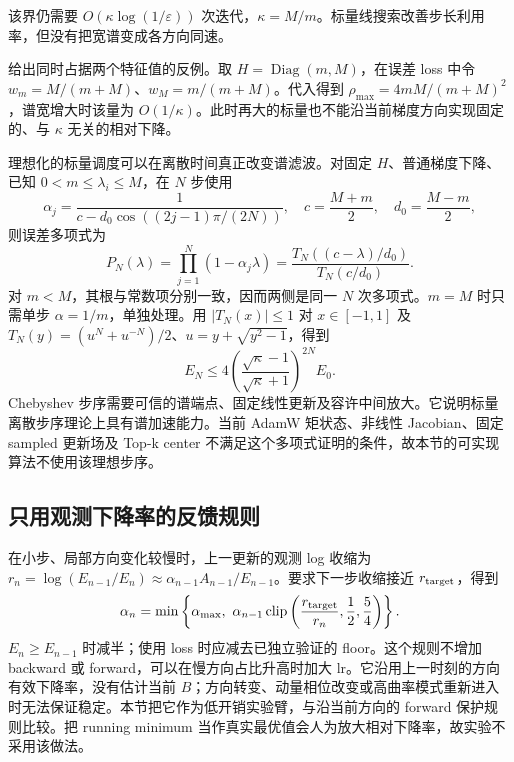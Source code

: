 \documentclass[lang=cn,scheme=chinese,openany]{../book/elegantbook}
\begin{document}
该界仍需要 $O(\kappa\log(1/\varepsilon))$ 次迭代，$\kappa=M/m$。标量线搜索改善步长利用率，但没有把宽谱变成各方向同速。

给出同时占据两个特征值的反例。取 $H=\operatorname{Diag}(m,M)$，在误差 loss 中令 $w_m=M/(m+M)$、$w_M=m/(m+M)$。代入得到 $\rho_{\max}=4mM/(m+M)^2$，谱宽增大时该量为 $O(1/\kappa)$。此时再大的标量也不能沿当前梯度方向实现固定的、与 $\kappa$ 无关的相对下降。

理想化的标量调度可以在离散时间真正改变谱滤波。对固定 $H$、普通梯度下降、已知 $0<m\le\lambda_i\le M$，在 $N$ 步使用
\begin{equation}
\alpha_j=\frac{1}{c-d_0\cos((2j-1)\pi/(2N))},\quad
c=\frac{M+m}{2},\quad d_0=\frac{M-m}{2},
\end{equation}
则误差多项式为
\begin{equation}
P_N(\lambda)=\prod_{j=1}^N(1-\alpha_j\lambda)
=\frac{T_N((c-\lambda)/d_0)}{T_N(c/d_0)}.
\end{equation}
对 $m<M$，其根与常数项分别一致，因而两侧是同一 $N$ 次多项式。$m=M$ 时只需单步 $\alpha=1/m$，单独处理。用 $|T_N(x)|\le1$ 对 $x\in[-1,1]$ 及 $T_N(y)=(u^N+u^{-N})/2$、$u=y+\sqrt{y^2-1}$，得到
\begin{equation}
E_N\le4\left(\frac{\sqrt\kappa-1}{\sqrt\kappa+1}\right)^{2N}E_0.
\end{equation}
Chebyshev 步序需要可信的谱端点、固定线性更新及容许中间放大。它说明标量离散步序理论上具有谱加速能力。当前 AdamW 矩状态、非线性 Jacobian、固定 sampled 更新场及 Top-k center 不满足这个多项式证明的条件，故本节的可实现算法不使用该理想步序。

\subsection{只用观测下降率的反馈规则}

在小步、局部方向变化较慢时，上一更新的观测 log 收缩为 $r_n=\log(E_{n-1}/E_n)\approx\alpha_{n-1}A_{n-1}/E_{n-1}$。要求下一步收缩接近 $r_{\rm target}$，得到
\begin{equation}
\alpha_n=\min\left\{\alpha_{\max},\ \alpha_{n-1}\operatorname{clip}\left(\frac{r_{\rm target}}{r_n},\frac12,\frac54\right)\right\}.
\end{equation}
$E_n\ge E_{n-1}$ 时减半；使用 loss 时应减去已独立验证的 floor。这个规则不增加 backward 或 forward，可以在慢方向占比升高时加大 lr。它沿用上一时刻的方向有效下降率，没有估计当前 $B$；方向转变、动量相位改变或高曲率模式重新进入时无法保证稳定。本节把它作为低开销实验臂，与沿当前方向的 forward 保护规则比较。把 running minimum 当作真实最优值会人为放大相对下降率，故实验不采用该做法。
\end{document}
